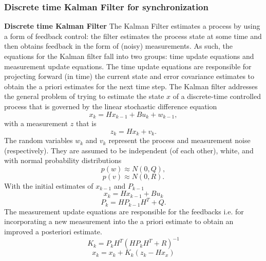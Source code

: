 \documentclass[journal]{IEEEtran}
\begin{document}
\subsubsection{\textbf{Discrete time Kalman Filter for synchronization}}
\textbf{Discrete time Kalman Filter} \newline
The Kalman Filter estimates a process by using a form of feedback
control: the filter estimates the process state at some time and
then obtains feedback in the form of (noisy) measurements. As such,
the equations for the Kalman filter fall into two groups: time
update equations and measurement update equations. The time update
equations are responsible for projecting forward (in time) the
current state and error covariance estimates to obtain the a priori
estimates for the next time step.
\newline
The Kalman filter addresses the general problem of trying to
estimate the state $x$ of a discrete-time controlled process that is
governed by the linear stochastic difference equation
\begin{equation}
 x_k = Hx_{k-1} + Bu_k + w_{k-1} ,
\end{equation}
with a measurement $z$ that is
\begin{equation}
 z_k = Hx_k + v_k.
\end{equation}
The random variables $w_k$ and $v_k$ represent the process and
measurement noise (respectively). They are assumed to be
independent (of each other), white, and with normal probability
distributions
\begin{equation}
 p(w) \approx N(0,Q),
\end{equation}
\begin{equation}
 p(v) \approx N(0,R).
\end{equation}
With the initial estimates of $x_{k-1}$ and $P_{k-1}$
\begin{equation}
x_k = Hx_{k-1} + Bu_k
\end{equation}
\begin{equation}
P_k = HP_{k-1}H^T + Q.
\end{equation}
The measurement update equations are responsible for the feedbacks
i.e. for incorporating a new measurement into the a priori estimate
to obtain an improved a posteriori estimate.
\begin{equation}
K_k = P_kH^T(HP_kH^T + R)^{-1} \label{kalmangain}
\end{equation}
\begin{equation}
x_k = x_k + K_k(z_k - Hx_x)
\end{equation}
\end{document}
